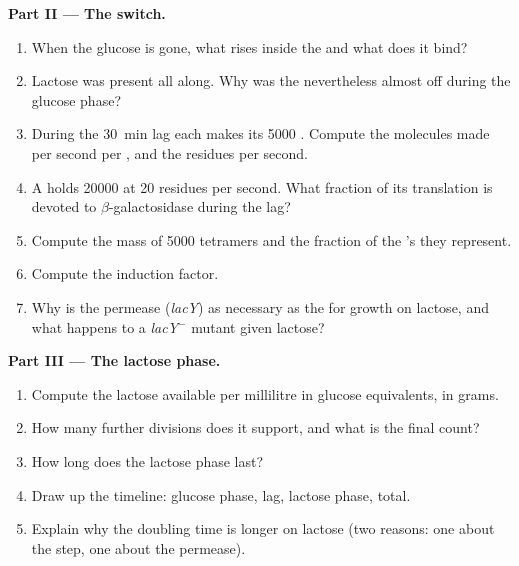 \begin{problem}
\medskip
\noindent\textbf{Part II --- The switch.}
\begin{enumerate}[resume]
  \item When the glucose is gone, what rises inside the  and
        what does it bind?
  \item Lactose was present all along. Why was the  nevertheless
        almost off during the glucose phase?
  \item During the \qty{30}{min} lag each  makes its \num{5000}
        . Compute the  molecules made per second per
        , and the residues per second.
  \item A  holds \num{20000}  at \qty{20}{} residues per
        second. What fraction of its translation is devoted to
        $\beta$-galactosidase during the lag?
  \item Compute the mass of \num{5000} tetramers and the fraction of
        the 's  they represent.
  \item Compute the induction factor.
  \item Why is the permease (\emph{lacY}) as necessary as the 
        for growth on lactose, and what happens to a \emph{lacY}$^-$
        mutant given lactose?
\end{enumerate}

\medskip
\noindent\textbf{Part III --- The lactose phase.}
\begin{enumerate}[resume]
  \item Compute the lactose available per millilitre in glucose
        equivalents, in grams.
  \item How many further divisions does it support, and what is the
        final  count?
  \item How long does the lactose phase last?
  \item Draw up the timeline: glucose phase, lag, lactose phase, total.
  \item Explain why the doubling time is longer on lactose (two
        reasons: one about the  step, one about the permease).
\end{enumerate}


\end{problem}
